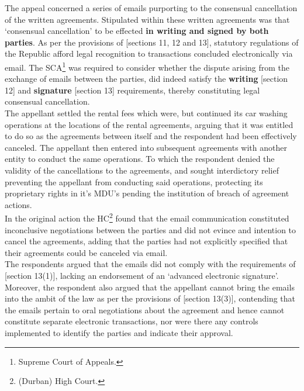 \documentclass[11pt]{article}
\begin{document}
The appeal concerned a series of emails purporting to the consensual
cancellation of the written agreements. Stipulated within these written
agreements was that `consensual cancellation' to be effected \textbf{in writing and
signed by both parties}. As per the provisions of [sections 11, 12 and
13]\cite{rsa02_elect_comm_trans_act}, statutory regulations of the Republic
afford legal recognition to transactions concluded electronically via email. The
SCA\footnote{Supreme Court of Appeals.} was required to consider whether the dispute
arising from the exchange of emails between the parties, did indeed satisfy the
\textbf{writing} [section 12]\cite{rsa02_elect_comm_trans_act} and \textbf{signature} [section
13]\cite{rsa02_elect_comm_trans_act} requirements, thereby constituting legal
consensual cancellation.\\

The appellant settled the rental fees which were, but continued its car washing
operations at the locations of the rental agreements, arguing that it was
entitled to do so as the agreements between itself and the respondent had been
effectively canceled. The appellant then entered into subsequent agreements with
another entity to conduct the same operations. To which the respondent denied
the validity of the cancellations to the agreements, and sought interdictory
relief preventing the appellant from conducting said operations, protecting its
proprietary rights in it's MDU's pending the institution of breach of
agreement actions.\\

In the original action the HC\footnote{(Durban) High Court.} found that the email
communication constituted inconclusive negotiations between the parties and did
not evince and intention to cancel the agreements, adding that the parties had
not explicitly specified that their agreements could be canceled via email.\\

The respondents argued that the emails did not comply with the requirements of
[section 13(1)]\cite{rsa02_elect_comm_trans_act}, lacking an endorsement of an
`advanced electronic signature'. Moreover, the respondent also argued that the
appellant cannot bring the emails into the ambit of the law as per the
provisions of [section 13(3)]\cite{rsa02_elect_comm_trans_act}, contending that
the emails pertain to oral negotiations about the agreement and hence cannot
constitute separate electronic transactions, nor were there any controls
implemented to identify the parties and indicate their approval.\\
\end{document}
